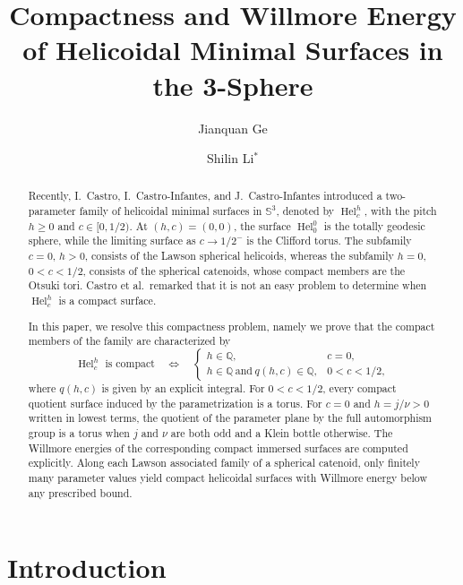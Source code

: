 \documentclass[a4paper,11pt]{amsart}
\title[Compact Helicoidal Minimal Surfaces]
{Compactness and Willmore Energy of Helicoidal Minimal Surfaces
in the 3-Sphere}
\author[J. Q. Ge]{Jianquan Ge}
\author[S. L. Li]{Shilin Li$^{*}$}
\date{}
\numberwithin{equation}{section}
\theoremstyle{plain}
\begin{document}
\begin{abstract}
Recently, I.~Castro, I.~Castro-Infantes, and J.~Castro-Infantes
introduced a two-parameter family of helicoidal minimal surfaces in
$\mathbb S^3$, denoted by $\operatorname{Hel}_c^h$, with the pitch
$h\geq0$ and $c\in[0,1/2)$. At
$(h,c)=(0,0)$, the surface $\operatorname{Hel}_0^0$ is the totally
geodesic sphere, while the limiting surface as $c\to1/2^-$ is the
Clifford torus. The subfamily $c=0$, $h>0$, consists of the Lawson
spherical helicoids, whereas the subfamily $h=0$, $0<c<1/2$,
consists of the spherical catenoids, whose compact members are the Otsuki
tori. Castro et al.\ remarked that it is not an easy problem to determine when $\operatorname{Hel}_c^h$ is a compact surface.

In this paper, we resolve this compactness problem, namely we prove that
the compact members of the family are characterized by
\[
\operatorname{Hel}_c^h \text{ is compact}
\quad\Longleftrightarrow\quad
\begin{cases}
h\in\mathbb Q, & c=0,\\[1mm]
h\in\mathbb Q\ \text{and}\ q(h,c)\in\mathbb Q,
& 0<c<1/2,
\end{cases}
\]
where $q(h,c)$ is given by an explicit integral. For $0<c<1/2$, 
every compact quotient surface induced by the
parametrization is a torus. For $c=0$ and $h=j/\nu>0$ written in
lowest terms, the quotient of the parameter plane by the full automorphism
group is a torus when
$j$ and $\nu$ are both odd and a Klein bottle otherwise. 
The Willmore energies of the corresponding compact immersed surfaces are
computed explicitly. Along each Lawson associated family of a spherical
catenoid, only finitely many parameter values yield compact helicoidal
surfaces with Willmore energy below any prescribed bound.
\end{abstract}


\maketitle

\section{Introduction}
\end{document}
